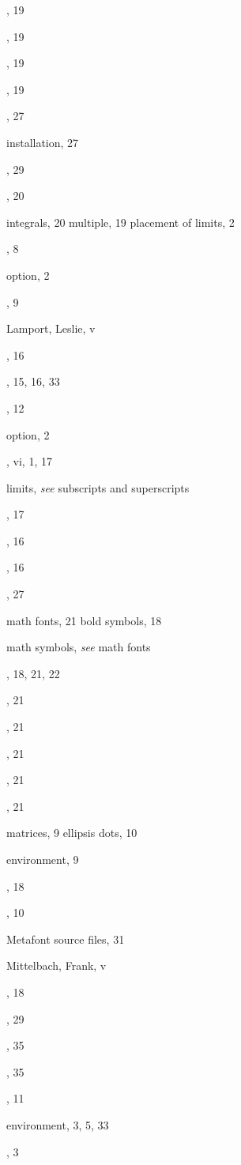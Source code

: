 \documentclass[leqno,titlepage,openany]{amsldoc}
\providecommand{\see}[2]{\textit{see} #1}
\begin{document}
\begin{theindex}
  \indexspace

  \item {}, 19
  \item {}, 19
  \item {}, 19
  \item {}, 19
  \item {}, 27
  \item installation, 27
  \item {}, 29
  \item {}, 20
  \item integrals, 20
    \subitem multiple, 19
    \subitem placement of limits, 2
  \item {}, 8
  \item {} option, 2

  \indexspace

  \item {}, 9
  \item Lamport, Leslie, v
  \item {}, 16
  \item {}, 15, 16, 33
  \item {}, 12
  \item {} option, 2
  \item {}, vi, 1, 17
  \item limits, \see{subscripts and superscripts}{2}
  \item {}, 17
  \item {}, 16
  \item {}, 16

  \indexspace

  \item {}, 27
  \item math fonts, 21
    \subitem bold symbols, 18
  \item math symbols, \see{math fonts}{21}
  \item {}, 18, 21, 22
  \item {}, 21
  \item {}, 21
  \item {}, 21
  \item {}, 21
  \item {}, 21
  \item matrices, 9
    \subitem ellipsis dots, 10
  \item {} environment, 9
  \item {}, 18
  \item {}, 10
  \item Metafont source files, 31
  \item Mittelbach, Frank, v
  \item {}, 18
  \item {}, 29
  \item {}, 35
  \item {}, 35
  \item {}, 11
  \item {} environment, 3, 5, 33
  \item {}, 3


\end{theindex}
\end{document}

